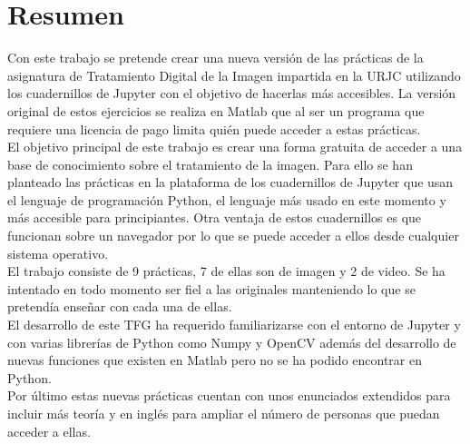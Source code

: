 \chapter*{Resumen}

Con este trabajo se pretende crear una nueva versión de las prácticas de la asignatura de Tratamiento Digital de la Imagen impartida en la URJC utilizando los cuadernillos de Jupyter con el objetivo de hacerlas más accesibles. La versión original de estos ejercicios se realiza en Matlab que al ser un programa que requiere una licencia de pago limita quién puede acceder a estas prácticas.\\

El objetivo principal de este trabajo es crear una forma gratuita de acceder a una base de conocimiento sobre el tratamiento de la imagen. Para ello se han planteado las prácticas en la plataforma de los cuadernillos de Jupyter que usan el lenguaje de programación Python, el lenguaje más usado en este momento y más accesible para principiantes. Otra ventaja de estos cuadernillos es que funcionan sobre un navegador por lo que se puede acceder a ellos desde cualquier sistema operativo.\\

El trabajo consiste de 9 prácticas, 7 de ellas son de imagen y 2 de video. Se ha intentado en todo momento ser fiel a las originales manteniendo lo que se pretendía enseñar con cada una de ellas.\\

El desarrollo de este TFG ha requerido familiarizarse con el entorno de Jupyter y con varias librerías de Python como Numpy y OpenCV además del desarrollo de nuevas funciones que existen en Matlab pero no se ha podido encontrar en Python.\\

Por último estas nuevas prácticas cuentan con unos enunciados extendidos para incluir más teoría y en inglés para ampliar el número de personas que puedan acceder a ellas.\\
